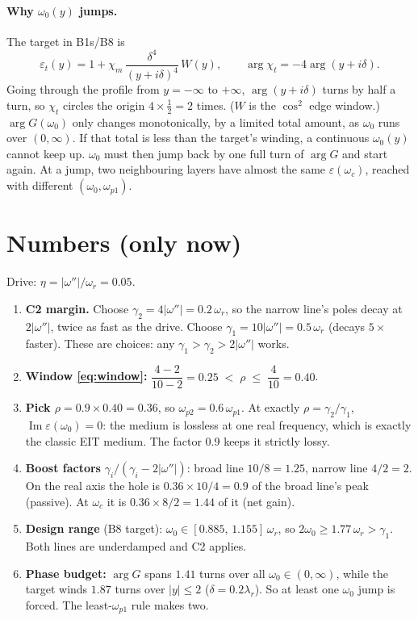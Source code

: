 \documentclass[11pt]{article}
\newcommand{\wi}{|\omega''|}          %
\newcommand{\wpa}{\omega_{p1}}
\newcommand{\wpb}{\omega_{p2}}
\renewcommand{\Im}{\operatorname{Im}}
\begin{document}
\paragraph{Why $\omega_0(y)$ jumps.}
The target in B1s/B8 is
\begin{equation}
  \varepsilon_t(y) = 1 + \chi_m\,\frac{\delta^4}{(y+i\delta)^4}\,W(y),
  \qquad \arg\chi_t = -4\arg(y+i\delta).
\end{equation}
Going through the profile from $y=-\infty$ to $+\infty$, $\arg(y+i\delta)$ turns by half a turn, so $\chi_t$ circles the origin $4\times\tfrac12=2$ times.
($W$ is the $\cos^2$ edge window.)
$\arg G(\omega_0)$ only changes monotonically, by a limited total amount, as $\omega_0$ runs over $(0,\infty)$.
If that total is less than the target's winding, a continuous $\omega_0(y)$ cannot keep up.
$\omega_0$ must then jump back by one full turn of $\arg G$ and start again.
At a jump, two neighbouring layers have almost the same $\varepsilon(\omega_c)$, reached with different $(\omega_0,\wpa)$.

\section{Numbers (only now)}\label{sec:numbers}
Drive: $\eta=\wi/\omega_r = 0.05$.
\begin{enumerate}[leftmargin=2em]
  \item \textbf{C2 margin.} Choose $\gamma_2=4\wi=0.2\,\omega_r$, so the narrow line's poles decay at $2\wi$, twice as fast as the drive.
  Choose $\gamma_1=10\wi=0.5\,\omega_r$ (decays $5\times$ faster).
  These are choices: any $\gamma_1>\gamma_2>2\wi$ works.
  \item \textbf{Window \eqref{eq:window}:}
  $\dfrac{4-2}{10-2}=0.25 \;<\;\rho\;\le\; \dfrac{4}{10}=0.40$.
  \item \textbf{Pick $\rho=0.9\times0.40=0.36$}, so $\wpb=0.6\,\wpa$.
  At exactly $\rho=\gamma_2/\gamma_1$, $\Im\varepsilon(\omega_0)=0$: the medium is lossless at one real frequency, which is exactly the classic EIT medium.
  The factor 0.9 keeps it strictly lossy.
  \item \textbf{Boost factors} $\gamma_i/(\gamma_i-2\wi)$: broad line $10/8=1.25$, narrow line $4/2=2$.
  On the real axis the hole is $0.36\times10/4=0.9$ of the broad line's peak (passive). At $\omega_c$ it is $0.36\times8/2=1.44$ of it (net gain).
  \item \textbf{Design range} (B8 target): $\omega_0\in[0.885,\,1.155]\,\omega_r$, so $2\omega_0\ge1.77\,\omega_r>\gamma_1$. Both lines are underdamped and C2 applies.
  \item \textbf{Phase budget:} $\arg G$ spans $1.41$ turns over all $\omega_0\in(0,\infty)$, while the target winds $1.87$ turns over $|y|\le2$ ($\delta=0.2\lambda_r$).
  So at least one $\omega_0$ jump is forced. The least-$\wpa$ rule makes two.
\end{enumerate}
\end{document}
